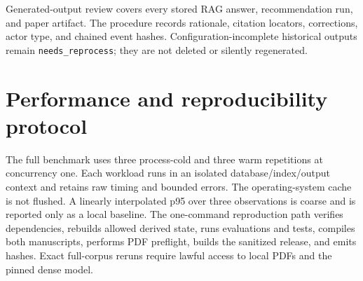 Generated-output review covers every stored RAG answer, recommendation run, and paper artifact. The procedure records rationale, citation locators, corrections, actor type, and chained event hashes. Configuration-incomplete historical outputs remain \texttt{needs\_reprocess}; they are not deleted or silently regenerated.

\section{Performance and reproducibility protocol}

The full benchmark uses three process-cold and three warm repetitions at concurrency one. Each workload runs in an isolated database/index/output context and retains raw timing and bounded errors. The operating-system cache is not flushed. A linearly interpolated p95 over three observations is coarse and is reported only as a local baseline. The one-command reproduction path verifies dependencies, rebuilds allowed derived state, runs evaluations and tests, compiles both manuscripts, performs PDF preflight, builds the sanitized release, and emits hashes. Exact full-corpus reruns require lawful access to local PDFs and the pinned dense model.
